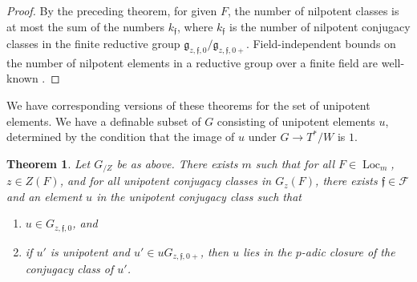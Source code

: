 \documentclass[12pt]{amsart}
\newcommand{\op}[1]{\operatorname{#1}}
\def\s{{\mathfrak{f}}}
\newcommand{\cF}{\mathcal{F}}
\newcommand{\fg}{\mathfrak{g}}
\theoremstyle{plain}
\newtheorem{theorem}[thm]{Theorem}
\theoremstyle{definition}
\begin{document}
\begin{proof} By the preceding theorem, for given $F$, the number of
  nilpotent classes is at most the sum of the numbers $k_\s$, where
  $k_\s$ is the number of nilpotent conjugacy classes in the finite
  reductive group $\fg_{z,\s,0}/\fg_{z,\s,0+}$.  Field-independent
  bounds on the number of nilpotent elements in a reductive
  group over a finite field are well-known \cite{carter}.
\end{proof}

We have corresponding versions of these theorems for the set of
unipotent elements.  We have a definable subset of $G$ consisting of
unipotent elements $u$, determined by the condition that the image of
$u$ under $G\to T^*/W$ is $1$.

\begin{theorem} Let $G_{/Z}$ be as above.  There exists
  $m$ such that for all $F\in \op{Loc}_m$, $z\in Z(F)$, and for all unipotent
  conjugacy classes in $G_z(F)$, there exists $\s\in \cF$ and an element
  $u$ in the unipotent conjugacy class such that
\begin{enumerate}
   \item $u\in G_{z,\s,0}$, and
   \item if $u'$ is unipotent and $u'\in u G_{z,\s,0+}$, then $u$
     lies in the $p$-adic closure of the conjugacy class of $u'$.
\end{enumerate}
\end{theorem}
\end{document}
